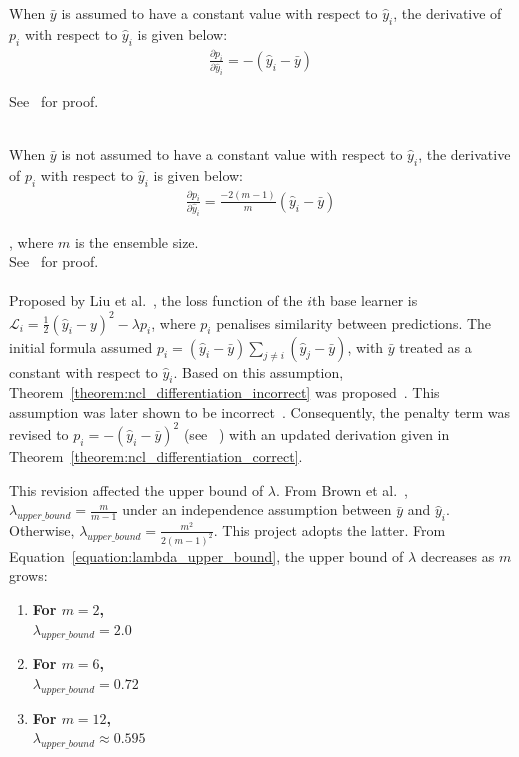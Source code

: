 \begin{theorem}\label{theorem:ncl_differentiation_incorrect}
    When $\bar{y}$ is assumed to have a constant value with respect to $\hat{y}_i$, the derivative of $p_i$ with respect to $\hat{y}_i$ is given below: 
    \begin{align*}
        \frac{\partial{p_i}}{\partial{\hat{y}_i}} = -(\hat{y}_i - \bar{y})
    \end{align*}
\end{theorem}
See~\cite{liu1999ensemble} for proof. 
\\
\\
\begin{theorem}\label{theorem:ncl_differentiation_correct}
    When $\bar{y}$ is not assumed to have a constant value with respect to $\hat{y}_i$, the derivative of $p_i$ with respect to $\hat{y}_i$ is given below: 
    \begin{align*}
        \frac{\partial{p_i}}{\partial{\hat{y}_i}} = \frac{-2 (m - 1)}{m} (\hat{y}_i - \bar{y})
    \end{align*}
\end{theorem}
, where $m$ is the ensemble size. 
\\
See~\cite{brown2005managing} for proof. 
\\
\\
Proposed by Liu et al.\ \cite{liu1999ensemble}, the loss function of the $i$th base learner is $\mathcal{L}_i = \frac{1}{2} (\hat{y}_i - y)^2 - \lambda p_i$, where $p_i$ penalises similarity between predictions. The initial formula assumed $p_i = (\hat{y}_i - \bar{y}) \sum_{j \neq i} (\hat{y}_j - \bar{y})$, with $\bar{y}$ treated as a constant with respect to $\hat{y}_i$. Based on this assumption, Theorem~\ref{theorem:ncl_differentiation_incorrect} was proposed~\cite{liu1999ensemble}. This assumption was later shown to be incorrect~\cite{brown2005managing}. Consequently, the penalty term was revised to $p_i = -(\hat{y}_i - \bar{y})^2$ (see ~\cite{brown2003negative}) with an updated derivation given in Theorem~\ref{theorem:ncl_differentiation_correct}. 

This revision affected the upper bound of $\lambda$. From Brown et al.\ \cite{brown2005managing}, $\lambda_{upper\_bound} = \frac{m}{m - 1}$ under an independence assumption between $\bar{y}$ and $\hat{y}_i$. Otherwise, $\lambda_{upper\_bound} = \frac{m^2}{2(m - 1)^2}$. This project adopts the latter. From Equation~\ref{equation:lambda_upper_bound}, the upper bound of $\lambda$ decreases as $m$ grows: 
\begin{enumerate}
    \item \textbf{For $m = 2$, } \\
    $\lambda_{upper\_bound} = 2.0$

    \item \textbf{For $m = 6$, } \\
    $\lambda_{upper\_bound} = 0.72$

    \item \textbf{For $m = 12$, } \\
    $\lambda_{upper\_bound} \approx 0.595$
\end{enumerate}


